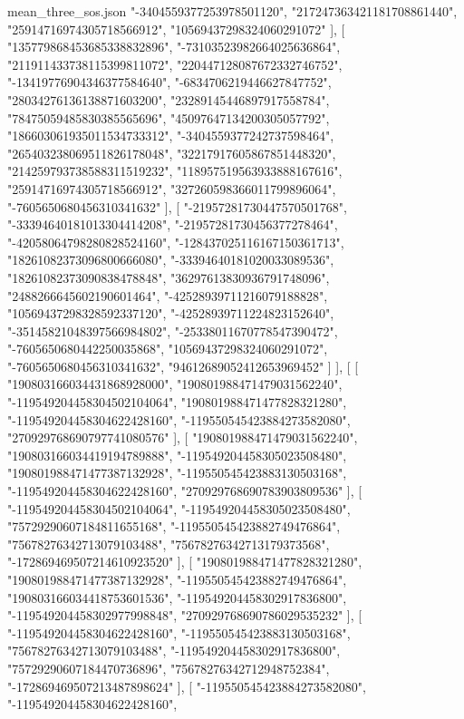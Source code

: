 \begin{filecontents*}[overwrite]{mean_three_sos.json}
    "-3404559377253978501120",
    "217247363421181708861440",
    "25914716974305718566912",
    "10569437298324060291072"
   ],
   [
    "135779868453685338832896",
    "-73103523982664025636864",
    "211911433738115399811072",
    "220447128087672332746752",
    "-13419776904346377584640",
    "-6834706219446627847752",
    "28034276136138871603200",
    "23289145446897917558784",
    "78475059485830385565696",
    "45097647134200305057792",
    "186603061935011534733312",
    "-3404559377242737598464",
    "265403238069511826178048",
    "32217917605867851448320",
    "214259793738588311519232",
    "118957519563933888167616",
    "25914716974305718566912",
    "327260598366011799896064",
    "-7605650680456310341632"
   ],
   [
    "-21957281730447570501768",
    "-33394640181013304414208",
    "-21957281730456377278464",
    "-42058064798280828524160",
    "-128437025116167150361713",
    "18261082373096800666080",
    "-33394640181020033089536",
    "18261082373090838478848",
    "36297613830936791748096",
    "2488266645602190601464",
    "-42528939711216079188828",
    "10569437298328592337120",
    "-42528939711224823152640",
    "-35145821048397566984802",
    "-25338011670778547390472",
    "-7605650680442250035868",
    "10569437298324060291072",
    "-7605650680456310341632",
    "94612689052412653969452"
   ]
  ],
  [
   [
    "190803166034431868928000",
    "190801988471479031562240",
    "-119549204458304502104064",
    "190801988471477828321280",
    "-119549204458304622428160",
    "-119550545423884273582080",
    "270929768690797741080576"
   ],
   [
    "190801988471479031562240",
    "190803166034419194789888",
    "-119549204458305023508480",
    "190801988471477387132928",
    "-119550545423883130503168",
    "-119549204458304622428160",
    "270929768690783903809536"
   ],
   [
    "-119549204458304502104064",
    "-119549204458305023508480",
    "75729290607184811655168",
    "-119550545423882749476864",
    "75678276342713079103488",
    "75678276342713179373568",
    "-172869469507214610923520"
   ],
   [
    "190801988471477828321280",
    "190801988471477387132928",
    "-119550545423882749476864",
    "190803166034418753601536",
    "-119549204458302917836800",
    "-119549204458302977998848",
    "270929768690786029535232"
   ],
   [
    "-119549204458304622428160",
    "-119550545423883130503168",
    "75678276342713079103488",
    "-119549204458302917836800",
    "75729290607184470736896",
    "75678276342712948752384",
    "-172869469507213487898624"
   ],
   [
    "-119550545423884273582080",
    "-119549204458304622428160",

\end{filecontents*}

